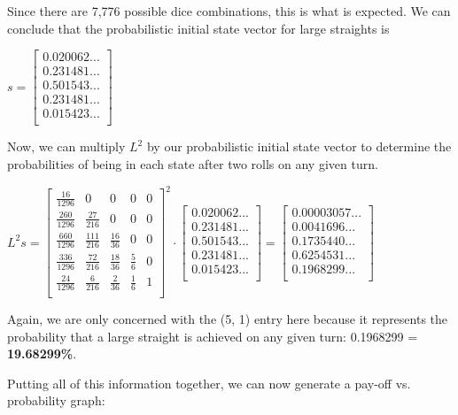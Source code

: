 \documentclass[12pt,a4paper]{article}
\begin{document}
\begin{itemize}
    Since there are 7,776 possible dice combinations, this is what is expected. We can conclude that the probabilistic initial state vector for large straights is \\
\begin{center}
    $s = \begin{bmatrix}
0.020062... \\
0.231481... \\
0.501543... \\
0.231481... \\
0.015423... \\
\end{bmatrix}$
\end{center}

Now, we can multiply $L^2$ by our probabilistic initial state vector to determine the probabilities of being in each state after two rolls on any given turn.

$L^2s = {\begin{bmatrix}
\frac{16}{1296} & 0 & 0 & 0 & 0\\[6pt]
\frac{260}{1296} & \frac{27}{216} & 0 & 0 & 0\\[6pt]
\frac{660}{1296} & \frac{111}{216} & \frac{16}{36} & 0 & 0\\[6pt]
\frac{336}{1296} & \frac{72}{216} & \frac{18}{36} & \frac{5}{6} & 0\\[6pt]
\frac{24}{1296} & \frac{6}{216} & \frac{2}{36} & \frac{1}{6} & 1 \\[6pt]
\end{bmatrix}}^2 \cdot  \begin{bmatrix}
0.020062... \\
0.231481... \\
0.501543... \\
0.231481... \\
0.015423... \\
\end{bmatrix} = \begin{bmatrix}
0.00003057... \\
0.0041696... \\
0.1735440... \\
0.6254531... \\
0.1968299... \\
\end{bmatrix}$

Again, we are only concerned with the (5, 1) entry here because it represents the probability that a large straight is achieved on any given turn: 0.1968299 = \textbf{19.68299\%}.

Putting all of this information together, we can now generate a pay-off vs. probability graph:
\vspace{5mm}
\end{itemize}
\end{document}
